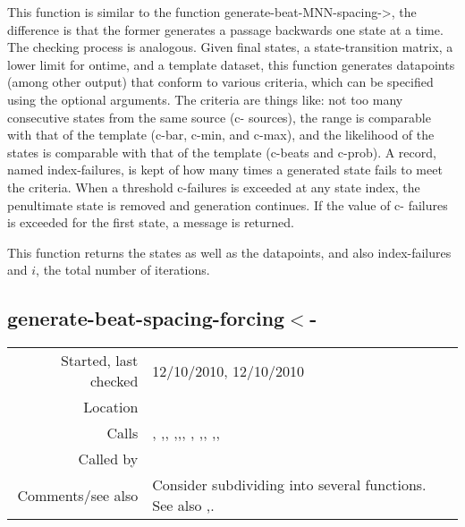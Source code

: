 \noindent This function is similar to the function
generate-beat-MNN-spacing->, the difference is that
the former generates a passage backwards one state at
a time. The checking process is analogous. Given final
states, a state-transition matrix, a lower limit for
ontime, and a template dataset, this function
generates datapoints (among other output) that conform
to various criteria, which can be specified using the
optional arguments. The criteria are things like: not
too many consecutive states from the same source (c-
sources), the range is comparable with that of the
template (c-bar, c-min, and c-max), and the likelihood
of the states is comparable with that of the template
(c-beats and c-prob). A record, named index-failures,
is kept of how many times a generated state fails to
meet the criteria. When a threshold c-failures is
exceeded at any state index, the penultimate state is
removed and generation continues. If the value of c-
failures is exceeded for the first state, a message is
returned.

This function returns the states as well as the
datapoints, and also index-failures and $i$, the total
number of iterations.


\subsection*{generate-beat-spacing-forcing$<$-}\label{fun:generate-beat-spacing-forcing<-}

\vspace{0.3cm}
\begin{tabular}{r|p{8cm}}
Started, last checked & 12/10/2010, 12/10/2010 \\
Location & \nameref{sec:generating-beat-MNN-spacing-backwards} \\
Calls & \nameref{fun:beat-spacing-states}, \nameref{fun:checklist<-p},\newline \nameref{fun:choose-one}, \nameref{fun:choose-one-with-beat},\newline \nameref{fun:geom-mean-likelihood-of-states<-},\newline \nameref{fun:index-1st-sublist-item>=}, \nameref{fun:my-last}, \newline \nameref{fun:nth-list-of-lists},\newline \nameref{fun:segments-strict}, \nameref{fun:sort-dataset-asc},\newline \nameref{fun:states2datapoints-by-lookup<-},\newline \nameref{fun:translate-datapoints-to-last-ontime} \\
Called by & \\
Comments/see also & Consider subdividing into several functions. See also \nameref{fun:generate-beat-MNN-spacing<-},\newline \nameref{fun:generate-beat-spacing-forcing->}. 
\end{tabular}

